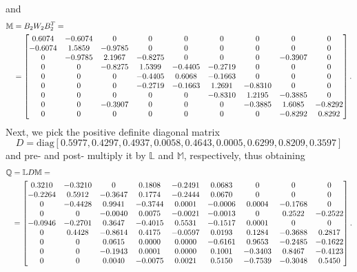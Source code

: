 \documentclass[a4paper]{article}
\theoremstyle{plain}
\newcommand{\matr}[1]{
\begin{bmatrix}
    #1
\end{bmatrix}
}
\begin{document}
and
\begin{equation*}
\begin{aligned}
\mathbb{M} &= B_2 W_2 B_2^T = \\
& =\matr{  
	0.6074 &  -0.6074    &     0     &    0    &     0     &    0   &      0      &   0  &       0\\
	-0.6074  &  1.5859  & -0.9785      &   0   &      0    &     0  &       0      &   0    &     0\\
	0  & -0.9785  &  2.1967 &  -0.8275  &       0 &       0    &     0 &  -0.3907    &     0\\
	0   &      0  & -0.8275 &   1.5399  & -0.4405  & -0.2719  &       0    &     0   &      0\\
	0   &      0  &       0 &  -0.4405  &  0.6068 & -0.1663   &      0     &    0    &     0\\
	0   &      0  &       0 &  -0.2719  & -0.1663 &   1.2691  & -0.8310   &      0   &      0\\
	0   &      0  &       0 &        0  &       0 &  -0.8310  &  1.2195  & -0.3885   &      0\\
	0   &      0  & -0.3907 &        0  &       0 &        0  & -0.3885 &   1.6085 &  -0.8292\\
	0   &      0  &      0  &       0   &      0  &       0   &      0  & -0.8292  &  0.8292}.
\end{aligned}
\normalsize
\end{equation*}
Next, we pick the positive definite diagonal matrix 
\[D = \mathrm{diag}[0.5977, 0.4297, 0.4937, 0.0058, 0.4643, 0.0005, 0.6299, 0.8209, 0.3597]\]
and pre- and post- multiply it by $\mathbb{L}$ and $\mathbb{M}$, respectively, thus obtaining
\begin{equation*}
\begin{aligned}
\mathbb{Q} &=\mathbb{L}D\mathbb{M} = \\
&=\matr{  0.3210 &  -0.3210    &     0  & 0.1808 &  -0.2491  &  0.0683    &     0   &      0   &      0\\
	-0.2264  &  0.5912 &  -0.3647  &  0.1774 &  -0.2444  &  0.0670   &      0   &      0  &       0\\
	0  & -0.4428  &  0.9941 &  -0.3744 &   0.0001 &  -0.0006  &  0.0004  & -0.1768     &    0\\
	0     &    0  & -0.0040  &  0.0075  & -0.0021 &  -0.0013    &     0  &  0.2522 &  -0.2522\\
	-0.0946  & -0.2701 &   0.3647  & -0.4015   & 0.5531  & -0.1517  &  0.0001    &     0     &    0\\
	0  &  0.4428  & -0.8614 &   0.4175 &  -0.0597 &   0.0193   & 0.1284 &  -0.3688  &  0.2817\\
	0   &      0   & 0.0615 &   0.0000 &   0.0000 &  -0.6161   & 0.9653  & -0.2485  & -0.1622\\
	0   &      0  & -0.1943 &   0.0001  &  0.0000 &   0.1001 &  -0.3403  &  0.8467  & -0.4123\\
	0   &      0  &  0.0040 &  -0.0075 &   0.0021 &   0.5150 &  -0.7539  & -0.3048  &  0.5450}.
\end{aligned}
\normalsize
\end{equation*}
\end{document}

